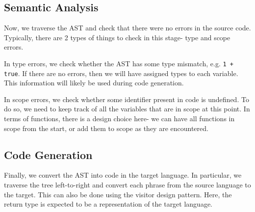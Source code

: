         
        



\subsection{Semantic Analysis}
Now, we traverse the AST and check that there were no errors in the source code. Typically, there are 2 types of things to check in this stage- type and scope errors. 

In type errors, we check whether the AST has some type mismatch, e.g. \texttt{1 + true}. If there are no errors, then we will have assigned types to each variable. This information will likely be used during code generation.

In scope errors, we check whether some identifier present in code is undefined. To do so, we need to keep track of all the variables that are in scope at this point. In terms of functions, there is a design choice here- we can have all functions in scope from the start, or add them to scope as they are encountered. 

\subsection{Code Generation}
Finally, we convert the AST into code in the target language. In particular, we traverse the tree left-to-right and convert each phrase from the source language to the target. This can also be done using the visitor design pattern. Here, the return type is expected to be a representation of the target language.
